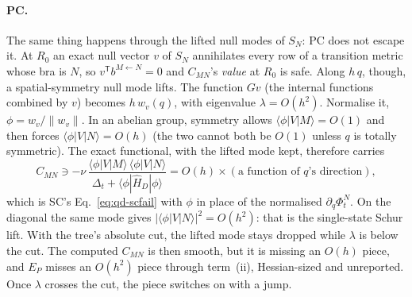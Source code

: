 \documentclass[11pt]{article}
\newcommand{\T}{\mathsf T}
\begin{document}
\paragraph{PC.} The same thing happens through the lifted null modes of
$S_N$: PC does not escape it. At $R_0$ an exact null vector $v$ of $S_N$
annihilates every row of a transition metric whose bra is $N$, so
$v^\T b^{M\leftarrow N} = 0$ and $C_{MN}$'s \emph{value} at $R_0$ is safe.
Along $h\,q$, though, a spatial-symmetry null mode lifts. The function $G
v$ (the internal functions combined by $v$) becomes $h\,w_v(q)$, with
eigenvalue $\lambda = O(h^2)$. Normalise it, $\phi = w_v/\lVert
w_v\rVert$. In an abelian group, symmetry allows $\langle\phi|V|M\rangle =
O(1)$ and then forces $\langle\phi|V|N\rangle = O(h)$ (the two cannot both
be $O(1)$ unless $q$ is totally symmetric). The exact functional, with the
lifted mode kept, therefore carries
\begin{equation}
  C_{MN} \ni -\nu\,\frac{\langle\phi|V|M\rangle\,\langle\phi|V|N\rangle}{\Delta_t + \langle\phi|\hat H_D|\phi\rangle}
  = O(h)\times(\text{a function of }q\text{'s direction}),
  \label{eq:qd-pcfail}
\end{equation}
which is SC's Eq.~\eqref{eq:qd-scfail} with $\phi$ in place of the
normalised $\partial_q\Phi^N_t$. On the diagonal the same mode gives
$|\langle\phi|V|N\rangle|^2 = O(h^2)$: that is the single-state Schur lift.
With the tree's absolute cut, the lifted mode stays dropped while $\lambda$
is below the cut. The computed $C_{MN}$ is then smooth, but it is missing
an $O(h)$ piece, and $E_P$ misses an $O(h^2)$ piece through term~(ii),
Hessian-sized and unreported. Once $\lambda$ crosses the cut, the piece
switches on with a jump.
\end{document}
